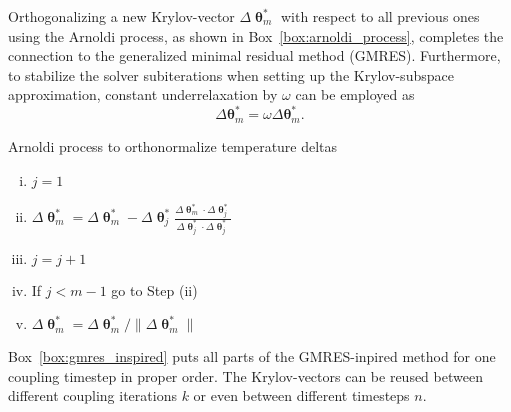 Orthogonalizing a new Krylov-vector $\Delta \bm{\uptheta}^*_{m}$ with respect to all previous ones using the Arnoldi process, as shown in Box~\ref{box:arnoldi_process}, completes the connection to the generalized minimal residual method (GMRES).
Furthermore, to stabilize the solver subiterations when setting up the Krylov-subspace approximation, constant underrelaxation by $\omega$ can be employed as
\begin{equation}
\Delta \boldsymbol{\theta}^*_{m}=\omega \Delta \boldsymbol{\theta}^*_{m}.
\end{equation}

\begin{framedbox}[htbp]
  \caption{Arnoldi process to orthonormalize temperature deltas}
  \label{box:arnoldi_process}
  \begin{center}
    \begin{minipage}{0.9\textwidth}
    \begin{enumerate}[(i)]
      \item \(j=1\)
      \item \(\Delta \bm\uptheta^*_m = \Delta \bm\uptheta^*_m - \Delta \bm\uptheta^*_j\frac{\Delta\bm\uptheta^*_m\cdot\Delta\bm\uptheta^*_j}{\Delta\bm \uptheta^*_j\cdot\Delta\bm\uptheta^*_j}\)
      \item \(j=j+1\)
      \item If \(j<m-1\) go to Step (ii)
      \item \(\Delta\bm \uptheta^*_m = \Delta\bm\uptheta^*_m/\|\Delta \bm \uptheta^*_m\|\)
    \end{enumerate}
    \end{minipage}
  \end{center}
\end{framedbox}


Box~\ref{box:gmres_inspired} puts all parts of the GMRES-inpired method for one coupling timestep in proper order. The Krylov-vectors can be reused between different coupling iterations $k$ or even between different timesteps $n$.

